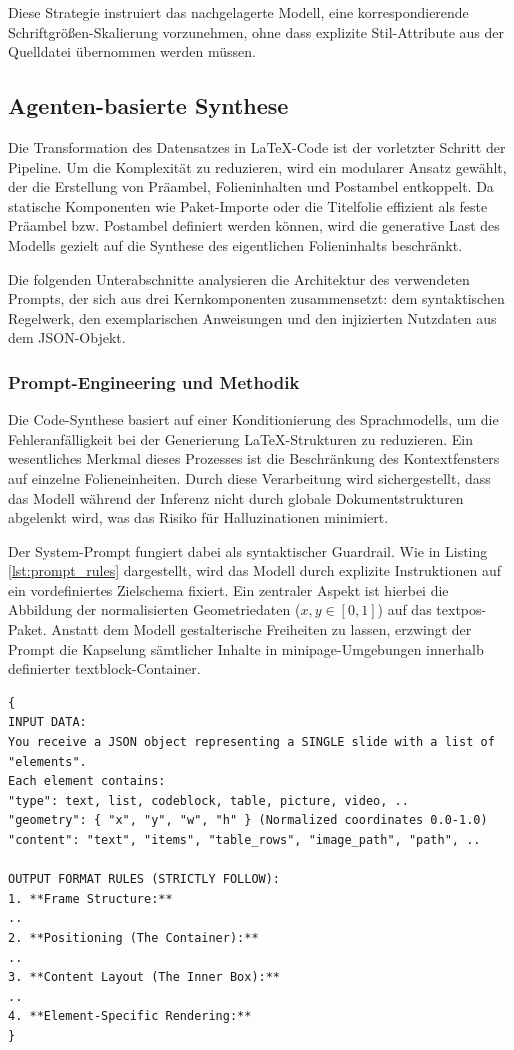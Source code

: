 \documentclass[a4paper]{article}
\begin{document}
Diese Strategie instruiert das nachgelagerte Modell, eine korrespondierende Schriftgrößen-Skalierung vorzunehmen, ohne dass explizite Stil-Attribute aus der Quelldatei übernommen werden müssen.

\subsection{Agenten-basierte Synthese}
Die Transformation des Datensatzes in LaTeX-Code ist der vorletzter Schritt der Pipeline. Um die Komplexität zu reduzieren, wird ein modularer Ansatz gewählt, der die Erstellung von Präambel, Folieninhalten und Postambel entkoppelt. Da statische Komponenten wie Paket-Importe oder die Titelfolie effizient als feste Präambel bzw. Postambel definiert werden können, wird die generative Last des Modells gezielt auf die Synthese des eigentlichen Folieninhalts beschränkt.

Die folgenden Unterabschnitte analysieren die Architektur des verwendeten Prompts, der sich aus drei Kernkomponenten zusammensetzt: dem syntaktischen Regelwerk, den exemplarischen Anweisungen und den injizierten Nutzdaten aus dem JSON-Objekt.

\subsubsection{Prompt-Engineering und Methodik}
Die Code-Synthese basiert auf einer  Konditionierung des Sprachmodells, um die Fehleranfälligkeit bei der Generierung LaTeX-Strukturen zu reduzieren. Ein wesentliches Merkmal dieses Prozesses ist die Beschränkung des Kontextfensters auf einzelne Folieneinheiten. Durch diese Verarbeitung wird sichergestellt, dass das Modell während der Inferenz nicht durch globale Dokumentstrukturen abgelenkt wird, was das Risiko für Halluzinationen minimiert.

Der System-Prompt fungiert dabei als syntaktischer Guardrail. Wie in Listing \ref{lst:prompt_rules} dargestellt, wird das Modell durch explizite Instruktionen auf ein vordefiniertes Zielschema fixiert. Ein zentraler Aspekt ist hierbei die Abbildung der normalisierten Geometriedaten ($x, y \in [0,1]$) auf das {textpos}-Paket. Anstatt dem Modell gestalterische Freiheiten zu lassen, erzwingt der Prompt die Kapselung sämtlicher Inhalte in {minipage}-Umgebungen innerhalb definierter {textblock}-Container.

\begin{lstlisting}[basicstyle=\small\ttfamily, frame=lines, caption={Definition des Eingabedatensatzes}, label={lst:prompt_rules}]
{
INPUT DATA:
You receive a JSON object representing a SINGLE slide with a list of "elements".
Each element contains:
"type": text, list, codeblock, table, picture, video, ..
"geometry": { "x", "y", "w", "h" } (Normalized coordinates 0.0-1.0)
"content": "text", "items", "table_rows", "image_path", "path", ..

OUTPUT FORMAT RULES (STRICTLY FOLLOW):
1. **Frame Structure:**
..
2. **Positioning (The Container):**
..
3. **Content Layout (The Inner Box):**
..
4. **Element-Specific Rendering:**
}
\end{lstlisting}
\end{document}
